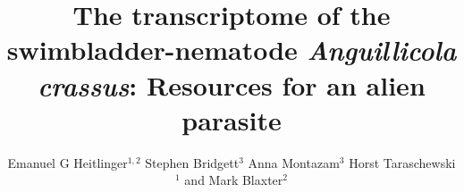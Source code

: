 \documentclass[10pt]{bmc_article}
\newenvironment{bmcformat}{\begin{raggedright}\baselineskip20pt\sloppy\setboolean{publ}{false}}{\end{raggedright}\baselineskip20pt\sloppy}
\begin{document}
\begin{bmcformat}



  \title{The transcriptome of the swimbladder-nematode
    \textit{Anguillicola crassus}: Resources for an alien parasite}
 


\author{Emanuel G Heitlinger\correspondingauthor$^{1,2}$%
       Stephen Bridgett$^{3}$%
       Anna Montazam$^{3}$%
       Horst Taraschewski$^1$%
       and Mark Blaxter$^2$%
     }%
      


      \address{%
        \iid(1)Department of Ecology and Parasitology, Zoological
        Institute 1, University of Karlsruhe,%
        Kornblumenstrasse 13, Karlsruhe, Germany\\
        \iid(2)Institute of Evolutionary Biology, The Ashworth laboratories, The University of Edinburgh, King's Buildings Campus, Edinburgh, UK
        \iid(3)The GenePool Sequencing Service, The Ashworth laboratories, The University of Edinburgh, King's Buildings Campus, Edinburgh, UK
      }%

\maketitle


\end{bmcformat}
\end{document}
